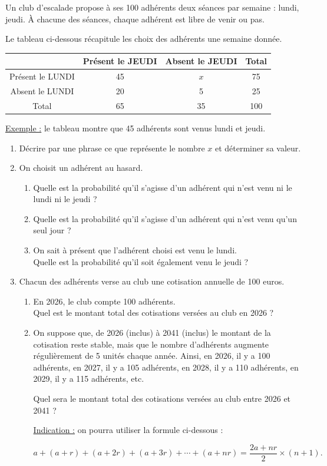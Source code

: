 Un club d'escalade propose à ses 100 adhérents deux séances par semaine : lundi, jeudi. À chacune des séances, chaque adhérent est libre de venir ou pas.

Le tableau ci-dessous récapitule les choix des adhérents une semaine donnée.

\begin{center}
\begin{tabular}{|c|c|c|c|}
\hline
 & Présent le JEUDI & Absent le JEUDI & Total \\
\hline
Présent le LUNDI & 45 & $x$ & 75 \\
\hline
Absent le LUNDI & 20 & 5 & 25 \\
\hline
Total & 65 & 35 & 100 \\
\hline
\end{tabular}
\end{center}

\underline{Exemple :} le tableau montre que 45 adhérents sont venus lundi et jeudi.

\begin{enumerate}
\item Décrire par une phrase ce que représente le nombre $x$ et déterminer sa valeur.

\item On choisit un adhérent au hasard.
\begin{enumerate}
\item Quelle est la probabilité qu'il s'agisse d'un adhérent qui n'est venu ni le lundi ni le jeudi ?
\item Quelle est la probabilité qu'il s'agisse d'un adhérent qui n'est venu qu'un seul jour ?
\item On sait à présent que l'adhérent choisi est venu le lundi. \\
Quelle est la probabilité qu'il soit également venu le jeudi ?
\end{enumerate}

\item Chacun des adhérents verse au club une cotisation annuelle de 100 euros.
\begin{enumerate}
\item En 2026, le club compte 100 adhérents. \\
Quel est le montant total des cotisations versées au club en 2026 ?
\item On suppose que, de 2026 (inclus) à 2041 (inclus) le montant de la cotisation reste stable, mais que le nombre d'adhérents augmente régulièrement de 5 unités chaque année. Ainsi, en 2026, il y a 100 adhérents, en 2027, il y a 105 adhérents, en 2028, il y a 110 adhérents, en 2029, il y a 115 adhérents, etc.

Quel sera le montant total des cotisations versées au club entre 2026 et 2041 ?

\underline{Indication :} on pourra utiliser la formule ci-dessous :

\[a + (a + r) + (a + 2r) + (a + 3r) + \cdots + (a + nr) = \frac{2a + nr}{2} \times (n + 1).\]
\end{enumerate}
\end{enumerate}
